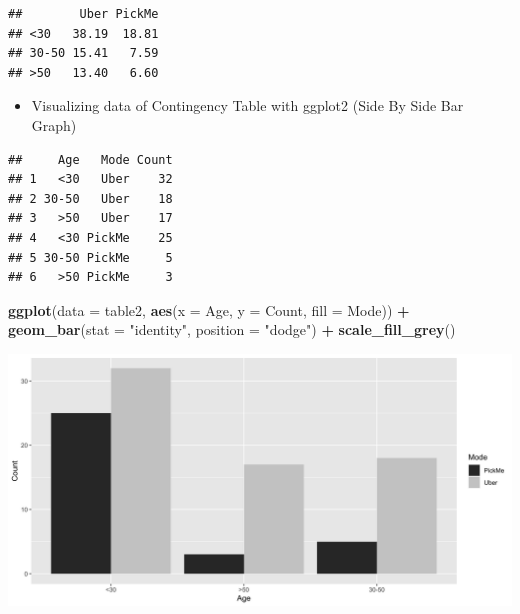 \documentclass[]{book}
\newenvironment{Shaded}{\begin{snugshade}}{\end{snugshade}}
\newcommand{\DataTypeTok}[1]{\textcolor[rgb]{0.13,0.29,0.53}{#1}}
\newcommand{\KeywordTok}[1]{\textcolor[rgb]{0.13,0.29,0.53}{\textbf{#1}}}
\newcommand{\NormalTok}[1]{#1}
\newcommand{\OperatorTok}[1]{\textcolor[rgb]{0.81,0.36,0.00}{\textbf{#1}}}
\newcommand{\StringTok}[1]{\textcolor[rgb]{0.31,0.60,0.02}{#1}}
\providecommand{\tightlist}{%
  \setlength{\itemsep}{0pt}\setlength{\parskip}{0pt}}
\begin{document}
\begin{verbatim}
##        Uber PickMe
## <30   38.19  18.81
## 30-50 15.41   7.59
## >50   13.40   6.60
\end{verbatim}

\begin{itemize}
\tightlist
\item
  Visualizing data of Contingency Table with ggplot2 (Side By Side Bar Graph)
\end{itemize}

\begin{Shaded}
\end{Shaded}

\begin{verbatim}
##     Age   Mode Count
## 1   <30   Uber    32
## 2 30-50   Uber    18
## 3   >50   Uber    17
## 4   <30 PickMe    25
## 5 30-50 PickMe     5
## 6   >50 PickMe     3
\end{verbatim}

\begin{Shaded}
\begin{Highlighting}[]
\KeywordTok{ggplot}\NormalTok{(}\DataTypeTok{data =}\NormalTok{ table2, }\KeywordTok{aes}\NormalTok{(}\DataTypeTok{x =}\NormalTok{ Age, }\DataTypeTok{y =}\NormalTok{ Count, }\DataTypeTok{fill =}\NormalTok{ Mode)) }\OperatorTok{+}\StringTok{ }
\StringTok{  }\KeywordTok{geom_bar}\NormalTok{(}\DataTypeTok{stat =} \StringTok{"identity"}\NormalTok{, }\DataTypeTok{position =} \StringTok{"dodge"}\NormalTok{) }\OperatorTok{+}
\StringTok{  }\KeywordTok{scale_fill_grey}\NormalTok{()}
\end{Highlighting}
\end{Shaded}

\begin{center}\includegraphics{figure/unnamed-chunk-10-1} \end{center}
\end{document}
